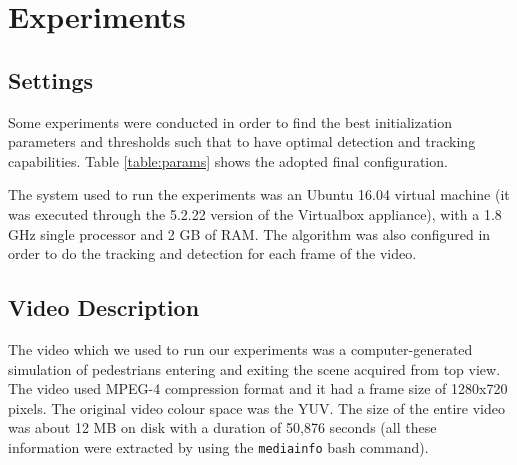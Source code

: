 \documentclass[runningheads]{llncs}
\begin{document}
\section{Experiments}

\subsection{Settings}
Some experiments were conducted in order to find the best initialization parameters and thresholds such that to have optimal detection and tracking capabilities. Table \ref{table:params} shows the adopted final configuration. 

The system used to run the experiments was an Ubuntu 16.04 virtual machine (it was executed through the 5.2.22 version of the Virtualbox appliance), with a 1.8 GHz single processor and 2 GB of RAM. The algorithm was also configured in order to do the tracking and detection for each frame of the video.

\begin{table}[h]
\centering
\caption{Final parameters for the algorithm}
\label{table:params}
\end{table}

\subsection{Video Description}

The video which we used to run our experiments was a computer-generated simulation of pedestrians entering and exiting the scene acquired from top view. The video used MPEG-4 compression format and it had a frame size of 1280x720 pixels. The original video colour space was the YUV. The size of the entire video was about 12 MB on disk with a duration of 50,876 seconds (all these information were extracted by using the \texttt{mediainfo} bash command).
\end{document}
